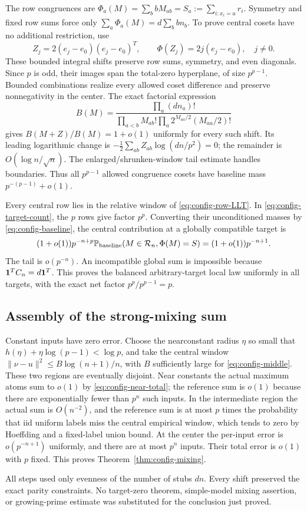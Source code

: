 The row congruences are
$\Phi_a(M)=\sum_b bM_{ab}=S_a:=\sum_{i:x_i=a}r_i$.
Symmetry and fixed row sums force only
$\sum_a\Phi_a(M)=d\sum_b bn_b$.
To prove central cosets have no additional restriction, use
\[
 Z_j=2(e_j-e_0)(e_j-e_0)^T,\qquad
 \Phi(Z_j)=2j(e_j-e_0),\quad j\ne0.
\]
These bounded integral shifts preserve row sums, symmetry, and
even diagonals. Since $p$ is odd, their images span the total-zero
hyperplane, of size $p^{p-1}$. Bounded combinations realize every
allowed coset difference and preserve nonnegativity in the center.
The exact factorial expression
\[
 B(M)=\frac{\prod_a(dn_a)!}
 {\prod_{a<b}M_{ab}!\prod_a2^{M_{aa}/2}(M_{aa}/2)!}
\]
gives $B(M+Z)/B(M)=1+o(1)$ uniformly for every such shift.
Its leading logarithmic change is
$-\tfrac12\sum_{ab}Z_{ab}\log(dn/p^2)=0$;
the remainder is $O(\log n/\sqrt n)$.
The enlarged/shrunken-window tail estimate handles boundaries.
Thus all $p^{p-1}$ allowed congruence cosets have baseline mass
$p^{-(p-1)}+o(1)$.

Every central row lies in the relative window of
\eqref{eq:config-row-LLT}. In \eqref{eq:config-target-count}, the
$p$ rows give factor $p^p$. Converting their unconditioned masses
by \eqref{eq:config-baseline}, the central contribution at a globally
compatible target is
\[
 (1+o(1))p^{-n+p}
 \mathbb P_{\rm baseline}(M\in\mathcal R_n,\Phi(M)=S)
 =(1+o(1))p^{-n+1}.
\]
The tail is $o(p^{-n})$. An incompatible global sum is impossible
because $\mathbf 1^TC_n=d\mathbf 1^T$. This proves the balanced arbitrary-target
local law uniformly in all targets, with the exact net factor
$p^p/p^{p-1}=p$.

\subsection{Assembly of the strong-mixing sum}
Constant inputs have zero error. Choose the nearconstant radius
$\eta$ so small that
$h(\eta)+\eta\log(p-1)<\log p$, and take the central window
$\|\nu-u\|^2\le B\log(n+1)/n$, with $B$ sufficiently large
for \eqref{eq:config-middle}. These two regions are eventually
disjoint. Near constants the actual maximum atoms sum to $o(1)$
by \eqref{eq:config-near-total}; the reference sum is $o(1)$ because
there are exponentially fewer than $p^n$ such inputs.
In the intermediate region the actual sum is $O(n^{-2})$, and
the reference sum is at most $p$ times the probability that iid
uniform labels miss the central empirical window, which tends to
zero by Hoeffding and a fixed-label union bound.
At the center the per-input error is $o(p^{-n+1})$ uniformly, and
there are at most $p^n$ inputs. Their total error is $o(1)$ with
$p$ fixed. This proves Theorem~\ref{thm:config-mixing}.

All steps used only evenness of the number of stubs $dn$.
Every shift preserved the exact parity constraints. No target-zero
theorem, simple-model mixing assertion, or growing-prime estimate
was substituted for the conclusion just proved.
